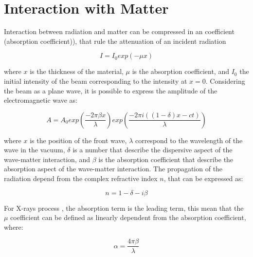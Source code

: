 \section{Interaction with Matter}
\label{sec: Interaction with Matter}
Interaction between radiation and matter can be compressed in an coefficient (absorption coefficient)), that rule the attenuation of an incident radiation

\begin{equation}
I = I_0 exp(-\mu x)
\label{eq: intensity}
\end{equation}

\begin{flushleft}
where $x $ is the thickness of the material, $\mu$ is the absorption coefficient, and $I_0$ the initial intensity of the beam corresponding to the intensity at $x=0$. Considering the beam as a plane wave, it is possible to express the  amplitude of the electromagnetic wave as:
\end{flushleft}

\begin{equation}
A=A_0exp(\frac{-2 \pi \beta x}{\lambda})exp(\frac{-2 \pi i ((1 - \delta)x-ct)}{\lambda})
\label{eq: amplitude}
\end{equation}

\begin{flushleft}
where $x$ is the position of the front wave, $\lambda$ correspond to the wavelength of the wave in the vacuum, $\delta $ is a number that describe the dispersive aspect of the wave-matter interaction, and $\beta $ is the absorption coefficient that describe the absorption aspect of the wave-matter interaction. The propagation of the radiation depend from the complex refractive index $n $, that can be expressed as: 
\end{flushleft}

\begin{equation}
n = 1 - \delta - i \beta
\label{eq: n_comlex}
\end{equation}

\begin{flushleft}
For X-rays process , the absorption term is the leading term, this mean that the $\mu$ coefficient can be defined as linearly dependent from the absorption coefficient, where:
\end{flushleft}

\begin{equation}
\alpha = \frac{4 \pi \beta}{\lambda}
\label{eq: alpha1}
\end{equation}


